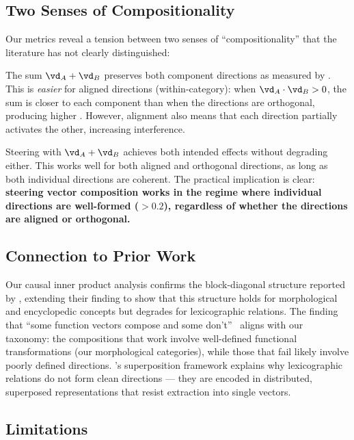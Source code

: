 \subsection{Two Senses of Compositionality}

Our metrics reveal a tension between two senses of ``compositionality'' that the literature has not clearly distinguished:

The sum $\vd_A + \vd_B$ preserves both component directions as measured by \cfs.
This is \emph{easier} for aligned directions (within-category): when $\vd_A \cdot \vd_B > 0$, the sum is closer to each component than when the directions are orthogonal, producing higher \cfs.
However, alignment also means that each direction partially activates the other, increasing interference.

Steering with $\vd_A + \vd_B$ achieves both intended effects without degrading either.
This works well for both aligned and orthogonal directions, as long as both individual directions are coherent.
The practical implication is clear: {\bf steering vector composition works in the regime where individual directions are well-formed (\loo $> 0.2$), regardless of whether the directions are aligned or orthogonal.}

\subsection{Connection to Prior Work}

Our causal inner product analysis confirms the block-diagonal structure reported by \citet{park2024linear}, extending their finding to show that this structure holds for morphological and encyclopedic concepts but degrades for lexicographic relations.
The finding that ``some function vectors compose and some don't''~\citep{todd2024function} aligns with our taxonomy: the compositions that work involve well-defined functional transformations (our morphological categories), while those that fail likely involve poorly defined directions.
\citet{elhage2022superposition}'s superposition framework explains why lexicographic relations do not form clean directions --- they are encoded in distributed, superposed representations that resist extraction into single vectors.

\subsection{Limitations}
\label{sec:limitations}

